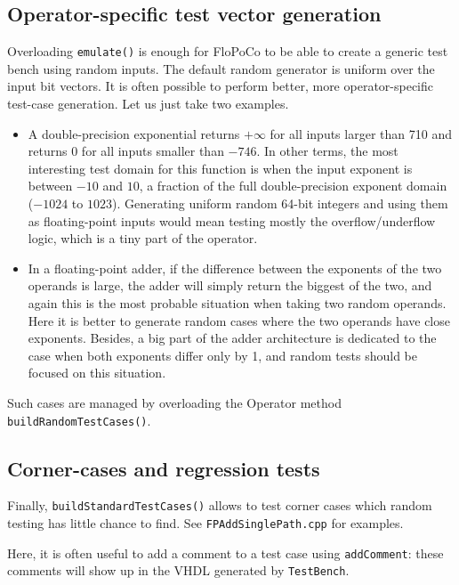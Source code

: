 \documentclass{article}
\begin{document}
\subsection{Operator-specific test  vector generation}
Overloading \texttt{\small emulate()} is enough for FloPoCo to be able
to create a generic test bench using random inputs. The default random generator is uniform over the input bit vectors. It is
often possible to perform better, more operator-specific test-case
generation. Let us just take two examples.

\begin{itemize}\item 
  A double-precision exponential returns $+\infty$ for all inputs
  larger than 710 and returns $0$ for all inputs smaller than
  $-746$. In other terms, the most interesting test domain for this
  function is when the input exponent is between $-10$ and $10$, a
  fraction of the full double-precision exponent domain ($-1024$ to
  $1023$). Generating uniform random 64-bit integers and using them as
  floating-point inputs would mean testing mostly the
  overflow/underflow logic, which is a tiny part of the operator.


\item In a floating-point adder, if the difference between the
  exponents of the two operands is large, the adder will simply return
  the biggest of the two, and again this is the most probable
  situation when taking two random operands. Here it is better to
  generate random cases where the two operands have close
  exponents. Besides, a big part of the adder architecture is
  dedicated to the case when both exponents differ only by 1, and
  random tests should be focused on this situation.
\end{itemize}
  Such cases are managed by overloading the Operator method
  \texttt{\small buildRandomTestCases()}. 

\subsection{Corner-cases and regression tests}
Finally, \texttt{\small buildStandardTestCases()} allows to test
corner cases which random testing has little chance to find. See
\texttt{\small FPAddSinglePath.cpp} for examples. 

Here, it is often useful to add
a comment to a test case using \texttt{\small addComment}: these comments
will show up in the VHDL generated by \texttt{\small TestBench}.
\end{document}

